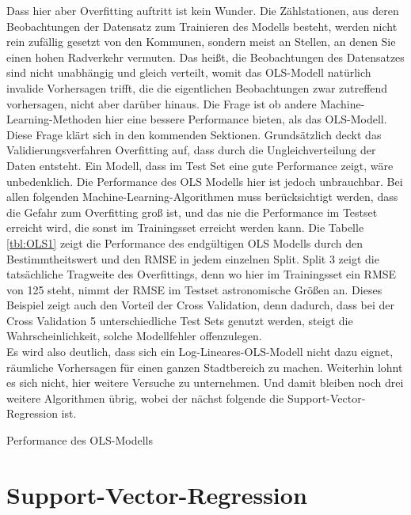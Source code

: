 \documentclass[a4paper,12pt]{thesis}
\begin{document}
Dass hier aber Overfitting auftritt ist kein Wunder. Die Zählstationen, aus deren Beobachtungen der Datensatz zum Trainieren des Modells besteht, werden nicht rein zufällig gesetzt von den Kommunen, sondern meist an Stellen, an denen Sie einen hohen Radverkehr vermuten. Das heißt, die Beobachtungen des Datensatzes sind nicht unabhängig und gleich verteilt, womit das OLS-Modell natürlich invalide Vorhersagen trifft, die die eigentlichen Beobachtungen zwar zutreffend vorhersagen, nicht aber darüber hinaus. Die Frage ist ob andere Machine-Learning-Methoden hier eine bessere Performance bieten, als das OLS-Modell. Diese Frage klärt sich in den kommenden Sektionen. Grundsätzlich deckt das Validierungsverfahren Overfitting auf, dass durch die Ungleichverteilung der Daten entsteht. Ein Modell, dass im Test Set eine gute Performance zeigt, wäre unbedenklich. Die Performance des OLS Modells hier ist jedoch unbrauchbar. Bei allen folgenden Machine-Learning-Algorithmen muss berücksichtigt werden, dass die Gefahr zum Overfitting groß ist, und das nie die Performance im Testset erreicht wird, die sonst im Trainingsset erreicht werden kann. Die Tabelle \ref{tbl:OLS1} zeigt die Performance des endgültigen OLS Modells durch den Bestimmtheitswert und den RMSE in jedem einzelnen Split. Split 3 zeigt die tatsächliche Tragweite des Overfittings, denn wo hier im Trainingsset ein RMSE von 125 steht, nimmt der RMSE im Testset astronomische Größen an. Dieses Beispiel zeigt auch den Vorteil der Cross Validation, denn dadurch, dass bei der Cross Validation 5 unterschiedliche Test Sets genutzt werden, steigt die Wahrscheinlichkeit, solche Modellfehler offenzulegen.\\
Es wird also deutlich, dass sich ein Log-Lineares-OLS-Modell nicht dazu eignet, räumliche Vorhersagen für einen ganzen Stadtbereich zu machen. Weiterhin lohnt es sich nicht, hier weitere Versuche zu unternehmen. Und damit bleiben noch drei weitere Algorithmen übrig, wobei der nächst folgende die Support-Vector-Regression ist.

\begin{table}
	\caption{Performance des OLS-Modells}
	\label{tbl:OLS1}
\end{table}

\section{Support-Vector-Regression}
\end{document}
